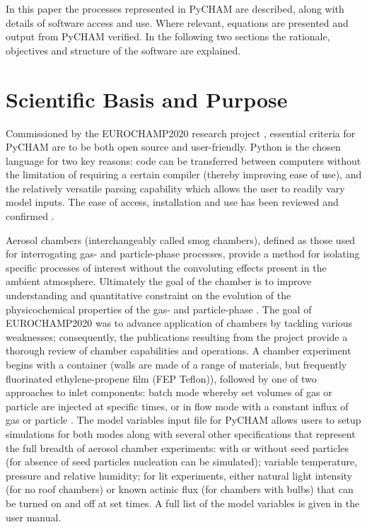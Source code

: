 \documentclass[gmd, manuscript]{copernicus}
\begin{document}
In this paper the processes represented in PyCHAM are described, along with details of software access and use.  Where relevant, equations are presented and output from PyCHAM verified.  In the following two sections the rationale, objectives and structure of the software are explained.

\section{Scientific Basis and Purpose}

Commissioned by the EUROCHAMP2020 research project \citep{EUROCHAMP2020}, essential criteria for PyCHAM are to be both open source and user-friendly.  Python is the chosen language for two key reasons: code can be transferred between computers without the limitation of requiring a certain compiler (thereby improving ease of use), and the relatively versatile parsing capability which allows the user to readily vary model inputs.  The ease of access, installation and use has been reviewed and confirmed \citep{OMeara2020}.

Aerosol chambers (interchangeably called smog chambers), defined as those used for interrogating gas- and particle-phase processes, provide a method for isolating specific processes of interest without the convoluting effects present in the ambient atmosphere.  Ultimately the goal of the chamber is to improve understanding and quantitative constraint on the evolution of the physicochemical properties of the gas- and particle-phase \citep{Schwantes2017, Charan2019, Hidy2019}.  The goal of EUROCHAMP2020 was to advance application of chambers by tackling various weaknesses; consequently, the publications \citep{EUROCHAMP2020} resulting from the project provide a thorough review of chamber capabilities and operations.  A chamber experiment begins with a container (walls are made of a range of materials, but frequently fluorinated ethylene-propene film (FEP Teflon)), followed by one of two approaches to inlet components: batch mode whereby set volumes of gas or particle are injected at specific times, or in flow mode with a constant influx of gas or particle \citep{Jaoui2014}.  The model variables input file for PyCHAM allows users to setup simulations for both modes along with several other specifications that represent the full breadth of aerosol chamber experiments: with or without seed particles (for absence of seed particles nucleation can be simulated); variable temperature, pressure and relative humidity; for lit experiments, either natural light intensity (for no roof chambers) or known actinic flux (for chambers with bulbs) that can be turned on and off at set times.  A full list of the model variables is given in the user manual.
\end{document}
